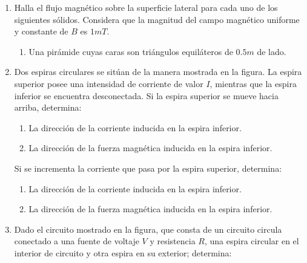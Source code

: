 \documentclass[10pt, twoside]{article}
\begin{document}
\begin{enumerate}
	\item Halla el flujo magnético sobre la superficie lateral para cada uno
		de los siguientes sólidos.
		Considera que la magnitud del campo magnético uniforme y constante de
		$B$ es $1mT$.
		\begin{enumerate}
			\item Una pirámide cuyas caras son triángulos equiláteros de
				$0.5m$ de lado.
		\end{enumerate}
	\item Dos espiras circulares se sitúan de la manera mostrada en la figura.
		La espira superior posee una intensidad de corriente de valor $I$,
		mientras que la espira inferior se encuentra desconectada.
		Si la espira superior se mueve hacia arriba, determina:
		\begin{enumerate}
			\item La dirección de la corriente inducida en la espira inferior.
			\item La dirección de la fuerza magnética inducida en la espira inferior.
		\end{enumerate}
		Si se incrementa la corriente que pasa por la espira superior, determina:
		\begin{enumerate}
			\item La dirección de la corriente inducida en la espira inferior.
			\item La dirección de la fuerza magnética inducida en la espira inferior.
		\end{enumerate}
	\item Dado el circuito mostrado en la figura, que consta de un circuito
		circula conectado a una fuente de voltaje $V$ y resistencia $R$,
		una espira circular en el interior de circuito y otra espira
		en su exterior; determina:
		\begin{figure}[H]
			\centering
		\end{figure}


\end{enumerate}
\end{document}
